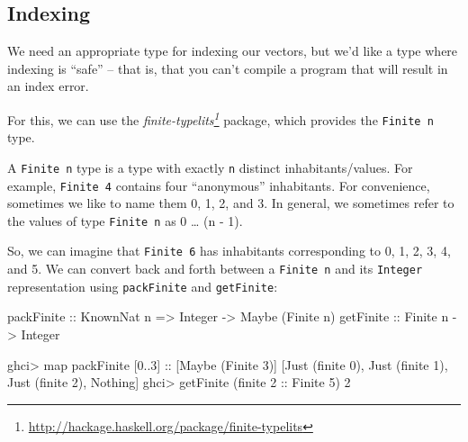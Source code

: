\documentclass[]{article}
\newenvironment{Shaded}{}{}
\newcommand{\DataTypeTok}[1]{\textcolor[rgb]{0.56,0.13,0.00}{#1}}
\newcommand{\DecValTok}[1]{\textcolor[rgb]{0.25,0.63,0.44}{#1}}
\newcommand{\FunctionTok}[1]{\textcolor[rgb]{0.02,0.16,0.49}{#1}}
\newcommand{\NormalTok}[1]{#1}
\newcommand{\OperatorTok}[1]{\textcolor[rgb]{0.40,0.40,0.40}{#1}}
\newcommand{\OtherTok}[1]{\textcolor[rgb]{0.00,0.44,0.13}{#1}}
\renewcommand{\href}[2]{#2\footnote{\url{#1}}}
\begin{document}
\subsection{Indexing}\label{indexing}

We need an appropriate type for indexing our vectors, but we'd like a type where
indexing is ``safe'' -- that is, that you can't compile a program that will
result in an index error.

For this, we can use the
\emph{\href{http://hackage.haskell.org/package/finite-typelits}{finite-typelits}}
package, which provides the \texttt{Finite\ n} type.

A \texttt{Finite\ n} type is a type with exactly \texttt{n} distinct
inhabitants/values. For example, \texttt{Finite\ 4} contains four ``anonymous''
inhabitants. For convenience, sometimes we like to name them 0, 1, 2, and 3. In
general, we sometimes refer to the values of type \texttt{Finite\ n} as 0
\ldots{} (n - 1).

So, we can imagine that \texttt{Finite\ 6} has inhabitants corresponding to 0,
1, 2, 3, 4, and 5. We can convert back and forth between a \texttt{Finite\ n}
and its \texttt{Integer} representation using \texttt{packFinite} and
\texttt{getFinite}:

\begin{Shaded}
\begin{Highlighting}[]
\OtherTok{packFinite ::} \DataTypeTok{KnownNat}\NormalTok{ n }\OtherTok{=\textgreater{}} \DataTypeTok{Integer}  \OtherTok{{-}\textgreater{}} \DataTypeTok{Maybe}\NormalTok{ (}\DataTypeTok{Finite}\NormalTok{ n)}
\OtherTok{getFinite  ::}               \DataTypeTok{Finite}\NormalTok{ n }\OtherTok{{-}\textgreater{}} \DataTypeTok{Integer}
\end{Highlighting}
\end{Shaded}

\begin{Shaded}
\begin{Highlighting}[]
\NormalTok{ghci}\OperatorTok{\textgreater{}} \FunctionTok{map}\NormalTok{ packFinite [}\DecValTok{0}\OperatorTok{..}\DecValTok{3}\NormalTok{]}\OtherTok{ ::}\NormalTok{ [}\DataTypeTok{Maybe}\NormalTok{ (}\DataTypeTok{Finite} \DecValTok{3}\NormalTok{)]}
\NormalTok{[}\DataTypeTok{Just}\NormalTok{ (finite }\DecValTok{0}\NormalTok{), }\DataTypeTok{Just}\NormalTok{ (finite }\DecValTok{1}\NormalTok{), }\DataTypeTok{Just}\NormalTok{ (finite }\DecValTok{2}\NormalTok{), }\DataTypeTok{Nothing}\NormalTok{]}
\NormalTok{ghci}\OperatorTok{\textgreater{}}\NormalTok{ getFinite (finite }\DecValTok{2}\OtherTok{ ::} \DataTypeTok{Finite} \DecValTok{5}\NormalTok{)}
\DecValTok{2}
\end{Highlighting}
\end{Shaded}
\end{document}
